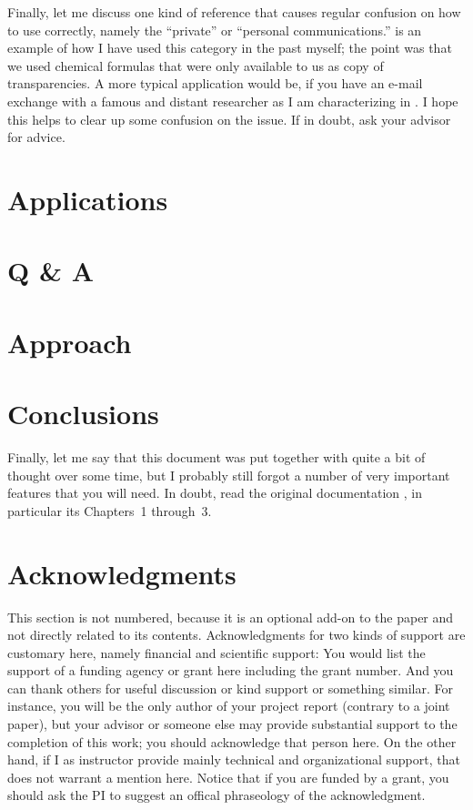 \documentclass[12pt]{article}
\numberwithin{equation}{section}
\numberwithin{table}{section}
\numberwithin{figure}{section}
\begin{document}
Finally, let me discuss one kind of reference that causes regular
confusion on how to use correctly, namely the ``private'' or ``personal
communications.''
\cite{Ho95} is an example of how I have used this category in the past myself;
the point was that we used chemical formulas that were only
available to us as copy of transparencies. A more typical application
would be, if you have an e-mail exchange with a famous and distant researcher
as I am characterizing in \cite{BigShot}. I hope this helps to clear
up some confusion on the issue. If in doubt, ask your advisor for advice.

\section{Applications} \label{applications}

\section{Q \& A} \label{qa}

\section{Approach} \label{approach}


\section{Conclusions}

Finally, let me say that this document was put together with quite a bit
of thought over some time, but I probably still forgot a number of very
important features that you will need. In doubt, read the original
documentation \cite{Lamport94}, in particular its Chapters~1 through~3.






\section*{Acknowledgments}

This section is not numbered, because it is an optional add-on to the
paper and not directly related to its contents.
Acknowledgments for two kinds of support are customary here, namely
financial and scientific support: You would list the
support of a funding agency or grant here including the grant number.
And you can thank others for useful discussion or kind support or
something similar. For instance, you will be the only author of your
project report (contrary to a joint paper), but your advisor or
someone else may provide substantial support to the completion of
this work; you should acknowledge that person here. On the other hand,
if I as instructor provide mainly technical and organizational support,
that does not warrant a mention here.
Notice that if you are funded by a grant, you should ask the PI
to suggest an offical phraseology of the acknowledgment.
 
\end{document}
